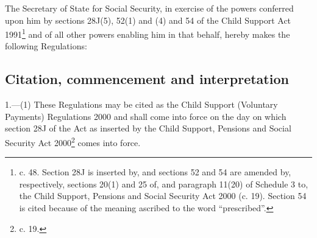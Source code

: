 \documentclass[12pt,a4paper]{article}
\title{\regstitle}
\author{S.I. 2000 No. 3177}
\date{Made 30th November 2000\\Laid before Parliament 6th December 2000\\Coming into force as provided in regulation 1(1)}
\begin{document}
\maketitle


\medskip

\noindent
The Secretary of State for Social Security, in exercise of the powers conferred upon him by sections 28J(5), 52(1) and (4) and 54 of the Child Support Act 1991\footnote{ c. 48. Section 28J is inserted by, and sections 52 and 54 are amended by, respectively, sections 20(1) and 25 of, and paragraph 11(20) of Schedule 3 to, the Child Support, Pensions and Social Security Act 2000 (c. 19). Section 54 is cited because of the meaning ascribed to the word “prescribed”.} and of all other powers enabling him in that behalf, hereby makes the following Regulations: 

{\sloppy

\tableofcontents

}

\bigskip

\setcounter{secnumdepth}{-2}

\subsection[1. Citation, commencement and interpretation]{Citation, commencement and interpretation}

1.---(1)  These Regulations may be cited as the Child Support (Voluntary Payments) Regulations 2000 and shall come into force on the day on which section 28J of the Act as inserted by the Child Support, Pensions and Social Security Act 2000\footnote{ c. 19.} comes into force.
\end{document}
